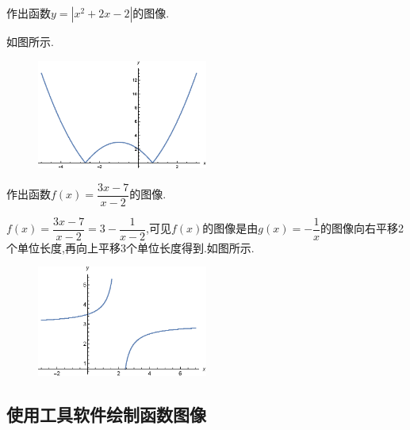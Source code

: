 \documentclass[lang=cn,math=cm,chinesefont=nofont,11pt,scheme=chinese,twocol]{elegantbook}
\begin{document}
\begin{example}
  作出函数$y=\left| x^2+2x-2\right|$的图像.
\end{example}

\begin{solution}
  如图所示.
\end{solution}

\begin{figure}[h]
  \centering
  \includegraphics[width=0.5\textwidth]{image/2.1.5function3.eps}
  \label{img:2.1.5function3}
\end{figure}

\begin{example}
  作出函数$f(x)=\dfrac{3x-7}{x-2}$的图像.
\end{example}

\begin{spacing}{1.8}
  
\end{spacing}
\begin{solution}
  \begin{spacing}{1.8}
    $f(x)=\dfrac{3x-7}{x-2}=3-\dfrac{1}{x-2}$,可见$f(x)$的图像是由$g(x)=-\dfrac{1}{x}$的图像向右平移2个单位长度,再向上平移$3$个单位长度得到.如图所示.
  \end{spacing}
\end{solution}

\begin{figure}[h]
  \centering
  \includegraphics[width=0.5\textwidth]{image/2.1.5function4.eps}
  \label{img:2.1.5function4}
\end{figure}

\subsection{使用工具软件绘制函数图像}
\end{document}
